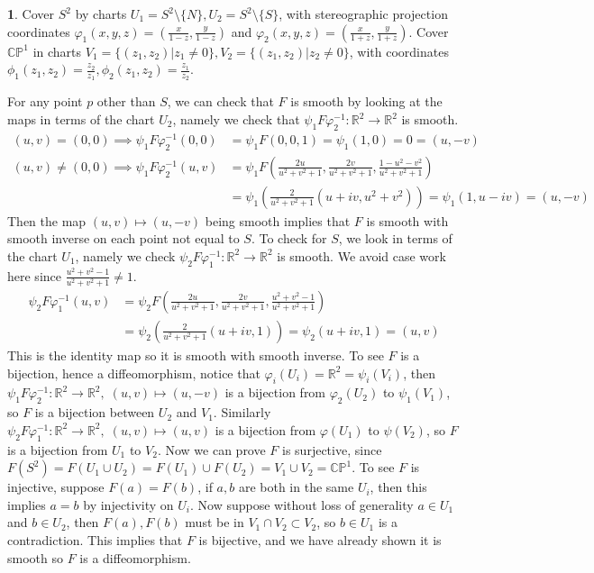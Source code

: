 \documentclass[10.5pt]{article}
\theoremstyle{definition}
\newtheorem{pb}{}
\newcommand{\set}[1]{\{#1\}}
\newcommand{\vp}{\varphi}
\begin{document}
    \begin{pb}

        Cover \(S^2\) by charts \(U_1 = S^2 \setminus \set{N}, U_2 = S^2 \setminus \set{S}\), with stereographic projection coordinates
        \(\varphi_1(x,y,z) = (\frac{x}{1-z},\frac{y}{1-z})\) and \(\varphi_2(x,y,z) = (\frac{x}{1+z},\frac{y}{1+z})\).
        Cover \(\mathbb{CP}^1\) in charts \(V_1 = \set{(z_1,z_2)\vert z_1 \neq 0}, V_2 = \set{(z_1,z_2)\vert z_2 \neq 0}\), with coordinates
        \(\phi_1(z_1,z_2) = \frac{z_2}{z_1}, \phi_2(z_1,z_2) = \frac{z_1}{z_2}\).

        For any point \(p\) other than \(S\), we can check that \(F\) is smooth by looking at the maps in terms of the chart \(U_2\),
        namely we check that \(\psi_1F\vp_2^{-1}: \mathbb{R}^2 \to \mathbb{R}^2\) is smooth.
        \begin{align*}
            (u,v) = (0,0) \implies \psi_1 F\vp_2^{-1}(0,0) &= \psi_1 F(0,0,1) = \psi_1(1,0) = 0 = (u,-v) \\
            (u,v) \neq (0,0) \implies \psi_1 F\vp_2^{-1}(u,v) &= \psi_1F(\frac{2u}{u^2 + v^2 + 1},\frac{2v}{u^2 + v^2 + 1},\frac{1-u^2-v^2}{u^2 + v^2 + 1}) \\
            &=\psi_1\left(\frac{2}{u^2+v^2+1}(u + iv, u^2+v^2)\right) = \psi_1(1,u-iv) = (u,-v)
        \end{align*}
        Then the map \((u,v) \mapsto (u,-v)\) being smooth implies that \(F\) is smooth with smooth inverse on each point not equal to \(S\).
        To check for \(S\), we look in terms of the chart \(U_1\), namely we check \(\psi_2F\vp_1^{-1}: \mathbb{R}^2 \to \mathbb{R}^2\) is smooth.
        We avoid case work here since \(\frac{u^2 + v^2 - 1}{u^2 + v^2 + 1} \neq 1\).
        \begin{align*}
            \psi_2F\vp_1^{-1}(u,v) &= \psi_2F\left(\frac{2u}{u^2+v^2+1},\frac{2v}{u^2+v^2+1},\frac{u^2+v^2-1}{u^2+v^2+1}\right) \\
            &= \psi_2\left(\frac{2}{u^2+v^2+1}(u+iv,1)\right) = \psi_2(u+iv,1) = (u,v)
        \end{align*}
        This is the identity map so it is smooth with smooth inverse. To see \(F\) is a bijection, hence a diffeomorphism, notice that
        \(\vp_i(U_i) = \mathbb{R}^2 = \psi_i(V_i)\), then \(\psi_1F\vp_2^{-1}: \mathbb{R}^2 \to \mathbb{R}^2, \; (u,v) \mapsto (u,-v)\) is a bijection from
        \(\vp_2(U_2)\) to \(\psi_1(V_1)\), so \(F\) is a bijection between \(U_2\) and \(V_1\). Similarly 
        \(\psi_2F\vp_1^{-1}: \mathbb{R}^2 \to \mathbb{R}^2, \; (u,v) \mapsto (u,v)\) is a bijection from \(\vp(U_1)\) to \(\psi(V_2)\),
        so \(F\) is a bijection from \(U_1\) to \(V_2\).
        Now we can prove \(F\) is surjective, since \(F(S^2) = F(U_1 \cup U_2) = F(U_1) \cup F(U_2) = V_1 \cup V_2 = \mathbb{CP}^1\). To see \(F\) is injective,
        suppose \(F(a) = F(b)\), if \(a,b\) are both in the same \(U_i\), then this implies \(a = b\) by injectivity on \(U_i\). Now suppose without loss of generality \(a \in U_1\)
        and \(b \in U_2\), then \(F(a), F(b)\) must be in \(V_1 \cap V_2 \subset V_2\), so \(b \in U_1\) is a contradiction. This implies that \(F\) is bijective, and we have already shown it is smooth
        so \(F\) is a diffeomorphism.
    \end{pb}
\end{document}
